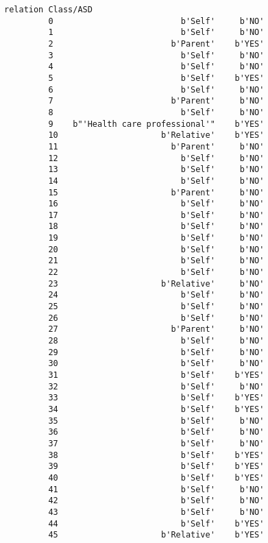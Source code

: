 \documentclass[11pt]{article}
\begin{document}
\begin{Verbatim}[commandchars=\\\{\}]
                                   relation Class/ASD  
         0                          b'Self'     b'NO'  
         1                          b'Self'     b'NO'  
         2                        b'Parent'    b'YES'  
         3                          b'Self'     b'NO'  
         4                          b'Self'     b'NO'  
         5                          b'Self'    b'YES'  
         6                          b'Self'     b'NO'  
         7                        b'Parent'     b'NO'  
         8                          b'Self'     b'NO'  
         9    b"'Health care professional'"    b'YES'  
         10                     b'Relative'    b'YES'  
         11                       b'Parent'     b'NO'  
         12                         b'Self'     b'NO'  
         13                         b'Self'     b'NO'  
         14                         b'Self'     b'NO'  
         15                       b'Parent'     b'NO'  
         16                         b'Self'     b'NO'  
         17                         b'Self'     b'NO'  
         18                         b'Self'     b'NO'  
         19                         b'Self'     b'NO'  
         20                         b'Self'     b'NO'  
         21                         b'Self'     b'NO'  
         22                         b'Self'     b'NO'  
         23                     b'Relative'     b'NO'  
         24                         b'Self'     b'NO'  
         25                         b'Self'     b'NO'  
         26                         b'Self'     b'NO'  
         27                       b'Parent'     b'NO'  
         28                         b'Self'     b'NO'  
         29                         b'Self'     b'NO'  
         30                         b'Self'     b'NO'  
         31                         b'Self'    b'YES'  
         32                         b'Self'     b'NO'  
         33                         b'Self'    b'YES'  
         34                         b'Self'    b'YES'  
         35                         b'Self'     b'NO'  
         36                         b'Self'     b'NO'  
         37                         b'Self'     b'NO'  
         38                         b'Self'    b'YES'  
         39                         b'Self'    b'YES'  
         40                         b'Self'    b'YES'  
         41                         b'Self'     b'NO'  
         42                         b'Self'     b'NO'  
         43                         b'Self'     b'NO'  
         44                         b'Self'    b'YES'  
         45                     b'Relative'    b'YES'  

\end{Verbatim}
\end{document}
